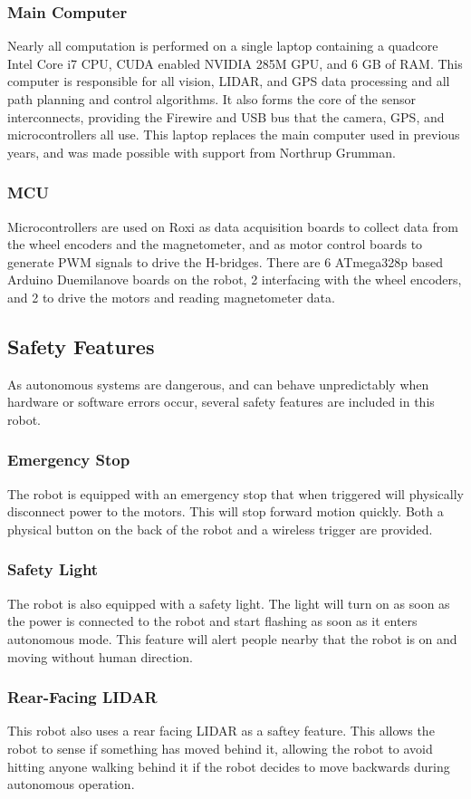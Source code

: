 \subsubsection{Main Computer}

Nearly all computation is performed on a single laptop containing a quadcore Intel Core i7 CPU, CUDA enabled NVIDIA 285M GPU, and 6 GB of RAM. This computer is responsible for all vision, LIDAR, and GPS data processing and all path planning and control algorithms. It also forms the core of the sensor interconnects, providing the Firewire and USB bus that the camera, GPS, and microcontrollers all use. This laptop replaces the main computer used in previous years, and was made possible with support from Northrup Grumman.

\subsubsection{MCU}

Microcontrollers are used on Roxi as data acquisition boards to collect data from the wheel encoders and the magnetometer, and as motor control boards to generate PWM signals to drive the H-bridges. There are 6 ATmega328p based Arduino Duemilanove boards on the robot, 2 interfacing with the wheel encoders, and 2 to drive the motors and reading magnetometer data.

\subsection{Safety Features}

As autonomous systems are dangerous, and can behave unpredictably when hardware or software errors occur, several safety features are included in this robot.

\subsubsection{Emergency Stop}

The robot is equipped with an emergency stop that when triggered will physically disconnect power to the motors. This will stop forward motion quickly. Both a physical button on the back of the robot and a wireless trigger are provided.

\subsubsection{Safety Light}
The robot is also equipped with a safety light. The light will turn on as soon as the power is connected to the robot and start flashing as soon as it enters autonomous mode. This feature will alert people nearby that the robot is on and moving without human direction.

\subsubsection{Rear-Facing LIDAR}

This robot also uses a rear facing LIDAR as a saftey feature. This allows the robot to sense if something has moved behind it, allowing the robot to avoid hitting anyone walking behind it if the robot decides to move backwards during autonomous operation.
